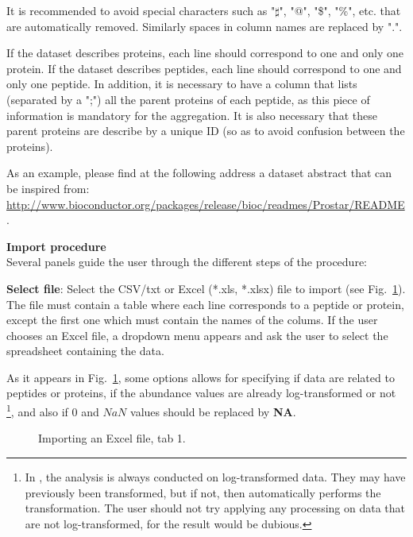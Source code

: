 \documentclass[12pt]{article}
\begin{document}
It is recommended to avoid special characters such as "$\sharp$", "@", "\$", "\%", etc. that are automatically removed. Similarly spaces in column names are replaced by ".".

If the dataset describes proteins, each line should correspond to one and only one protein. 
If the dataset describes peptides, each line should correspond to one and only one peptide. In addition, it is necessary to have a column that lists (separated by a ";") all the parent proteins of each peptide, as this piece of information is mandatory for the aggregation. It is also necessary that these parent proteins are describe by a unique ID (so as to avoid confusion between the proteins).

As an example, please find at the following address a dataset abstract that can be inspired from: \url{http://www.bioconductor.org/packages/release/bioc/readmes/Prostar/README}. 


\noindent \textbf{Import procedure}\\
\noindent Several panels guide the user through the different steps of the procedure:

\textbf {Select file}: Select the CSV/txt or Excel (*.xls, *.xlsx) file to import (see 
Fig.~\ref{fig:imp1}). The file must contain a table where each line 
corresponds to a peptide or protein, except the first one which must contain 
the names of the colums. 
If the user chooses an Excel file, a dropdown menu appears and ask the user to 
select the spreadsheet containing the data. 

As it appears in Fig.~\ref{fig:imp1}, some options allows for 
specifying if data are related to peptides or proteins, if the abundance values
are already log-transformed or not \footnote{In , the analysis is 
always conducted on log-transformed data. They may have previously been 
transformed, but if not, then  automatically performs the transformation. 
The user should not try applying any  processing on data that are not 
log-transformed, for the result would be dubious.}, and also if $0$ and $NaN$ 
values should be replaced by \textbf{NA}. 
\begin {figure}
\centering
{}
\caption{Importing an Excel file, tab 1.}\label{fig:imp1}
\end {figure}
\end{document}
